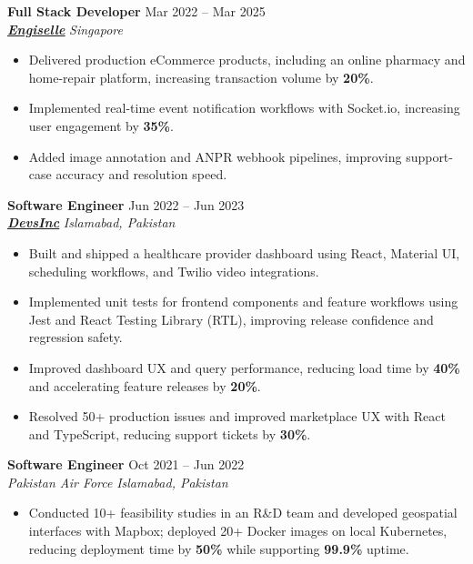 \documentclass[9pt,letterpaper]{article}
\newcommand{\role}[4]{\textbf{#1} \hfill #2 \\
\textit{#3} \hfill \textit{#4}\\[-4pt]}
\begin{document}
\role{Full Stack Developer}{Mar 2022 -- Mar 2025}{\href{https://www.engiselle.com/}{\textbf{\underline{Engiselle}}}}{Singapore}
\begin{itemize}[leftmargin=*, itemsep=0pt, topsep=0pt, partopsep=0pt, parsep=0pt, after=\vspace{2pt}]
  \item Delivered production eCommerce products, including an online pharmacy and home-repair platform, increasing transaction volume by \textbf{20\%}.
  \item Implemented real-time event notification workflows with Socket.io, increasing user engagement by \textbf{35\%}.
  \item Added image annotation and ANPR webhook pipelines, improving support-case accuracy and resolution speed.
\end{itemize}

\role{Software Engineer}{Jun 2022 -- Jun 2023}{\href{https://www.devsinc.com/}{\textbf{\underline{DevsInc}}}}{Islamabad, Pakistan}
\begin{itemize}[leftmargin=*, itemsep=0pt, topsep=0pt, partopsep=0pt, parsep=0pt, after=\vspace{2pt}]
  \item Built and shipped a healthcare provider dashboard using React, Material UI, scheduling workflows, and Twilio video integrations.
  \item Implemented unit tests for frontend components and feature workflows using Jest and React Testing Library (RTL), improving release confidence and regression safety.
  \item Improved dashboard UX and query performance, reducing load time by \textbf{40\%} and accelerating feature releases by \textbf{20\%}.
  \item Resolved 50+ production issues and improved marketplace UX with React and TypeScript, reducing support tickets by \textbf{30\%}.
\end{itemize}

\role{Software Engineer}{Oct 2021 -- Jun 2022}{Pakistan Air Force}{Islamabad, Pakistan}
\begin{itemize}[leftmargin=*, itemsep=0pt, topsep=0pt, partopsep=0pt, parsep=0pt, after=\vspace{2pt}]
  \item Conducted 10+ feasibility studies in an R\&D team and developed geospatial interfaces with Mapbox; deployed 20+ Docker images on local Kubernetes, reducing deployment time by \textbf{50\%} while supporting \textbf{99.9\%} uptime.
\end{itemize}
\end{document}
